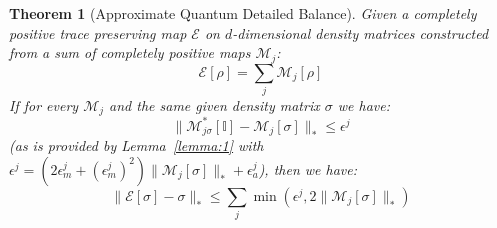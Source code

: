 \documentclass[aps,floatfix,10pt,amssymb,amsfont,amsmath,superscriptaddress,float,nofootinbib,longbibliography,nobalancelastpage,twocolumn]{revtex4-2}
\newtheorem{theorem}{Theorem}
\begin{document}
\begin{theorem}[Approximate Quantum Detailed Balance]
\label{theorem:quantumapproximatedeatildedbalance}
Given a completely positive trace preserving map $\mathcal{E}$ on $d$-dimensional density matrices constructed from a sum of completely positive maps $\mathcal{M}_j$:
\begin{equation}
    \mathcal{E}[\rho] = \sum_j \mathcal{M}_j[\rho]
\end{equation}
If for every $\mathcal{M}_j$ and the same given density matrix $\sigma$ we have:
\begin{equation}
    \|\mathcal{M}^*_{j\sigma}[\mathbb{I}]-\mathcal{M}_j[\sigma]\|_* \leq \epsilon^j
\end{equation}
(as is provided by Lemma~\ref{lemma:1} with $\epsilon^j = (2\epsilon^j_m+(\epsilon^j_m)^2)\|\mathcal{M}_j[\sigma]\|_* + \epsilon^j_a$), then we have:
\begin{equation}
     \|\mathcal{E}[\sigma]-\sigma\|_* \leq \sum_j\min\left(\epsilon^j, 2\|\mathcal{M}_j[\sigma]\|_*\right)
\end{equation}
\end{theorem}
\end{document}
